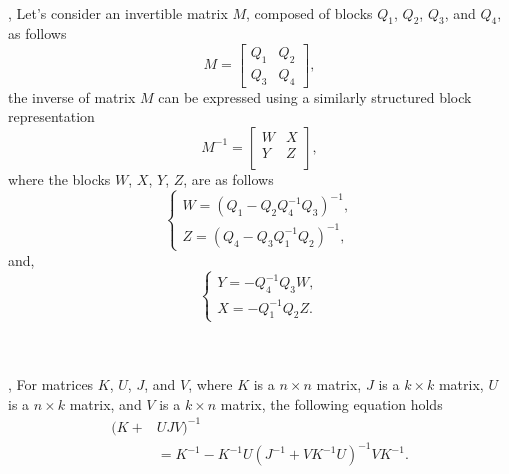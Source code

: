 \begin{lemma} 
    \label{lem: Mat inv}
     \quad \\
    \cite[Section 9.2.14]{mahmoud2021cyberphysical}, Let's consider an invertible matrix $M$, composed of blocks $Q_1$, $Q_2$, $Q_3$, and $Q_4$, as follows
    \begin{equation}
    \label{eq: M}
        M = \begin{bmatrix}
    Q_1 & Q_2\\
    Q_3 & Q_4
\end{bmatrix},
    \end{equation}
    the inverse of matrix $M$ can be expressed using a similarly structured block representation
    \begin{equation}
        M^{-1} =
\begin{bmatrix}
W & X \\
Y & Z \\
\end{bmatrix},
    \end{equation}
    where the blocks $W$, $X$, $Y$, $Z$, are as follows
\begin{equation}
\begin{cases}
W = \left( Q_1 - Q_2 Q_4^{-1} Q_3 \right)^{-1}, \\
Z = \left( Q_4 - Q_3 Q_1^{-1} Q_2 \right)^{-1},
\end{cases}
\end{equation}
and,
\begin{equation}
\begin{cases}
Y = -Q_4^{-1} Q_3 W, \\
X = -Q_1^{-1} Q_2 Z.
\end{cases}
\end{equation}\\
\end{lemma}

\begin{lemma}
    \label{lem: Woodbury}
    \quad \\
      \cite[Appendix. A, Solution to Problem 13.9]{higham2002accuracy}, For matrices $K$, $U$, $J$, and $V$, where $K$ is a $n\times n$ matrix, $J$ is a $k\times k$ matrix, $U$ is a $n\times k$ matrix, and $V$ is a $k\times n$ matrix, the following equation holds
    \begin{equation}
    \begin{split}
        (K + &UJV)^{-1} \\ &= K^{-1} - K^{-1}U(J^{-1} + VK^{-1}U)^{-1}VK^{-1}.
        \end{split}
    \end{equation}
\end{lemma}

